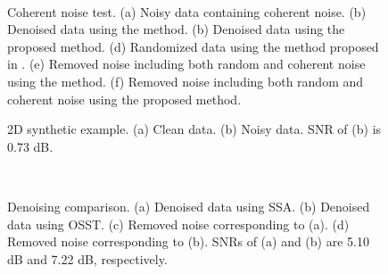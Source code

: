 \begin{figure}[htb!]
  \centering
      \\
   \caption{Coherent noise test. (a) Noisy data containing coherent noise. (b) Denoised data using the  method. (b) Denoised data using the proposed method. (d) Randomized data using the method proposed in \cite{weilin2017}.  (e) Removed noise including both random and coherent noise using the  method. (f) Removed noise including both random and coherent noise  using the proposed method.}
   \label{fig:coh}
\end{figure}

\begin{figure}[htb!]
  \centering
   \caption{2D synthetic example. (a) Clean data. (b) Noisy data. SNR of (b) is 0.73 dB.}
   \label{fig:syn-c,syn}
\end{figure}


\begin{figure}[htb!]
  \centering
   \\
   \caption{Denoising comparison. (a) Denoised data using SSA. (b) Denoised data using OSST. (c) Removed noise corresponding to (a). (d) Removed noise corresponding to (b). SNRs of (a) and (b) are 5.10 dB and 7.22 dB, respectively.}
   \label{fig:syn-dn}
\end{figure}


